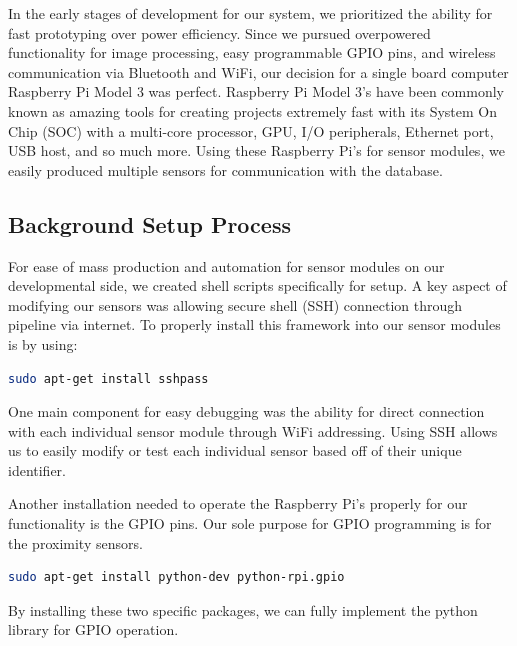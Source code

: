 In the early stages of development for our system, we prioritized the ability for fast prototyping over power efficiency. 
Since we pursued overpowered functionality for image processing, easy programmable GPIO pins, and wireless communication via Bluetooth and WiFi, our decision for a single board computer Raspberry Pi Model 3 was perfect.
Raspberry Pi Model 3's have been commonly known as amazing tools for creating projects extremely fast with its System On Chip (SOC) with a multi-core processor, GPU, I/O peripherals, Ethernet port, USB host, and so much more.
Using these Raspberry Pi's for sensor modules, we easily produced multiple sensors for communication with the database. 

\subsection{Background Setup Process} %
For ease of mass production and automation for sensor modules on our developmental side, we created shell scripts specifically for setup.
A key aspect of modifying our sensors was allowing secure shell (SSH) connection through pipeline via internet.
To properly install this framework into our sensor modules is by using:

\vspace{0.5cm}
\begin{lstlisting}[language=bash]
sudo apt-get install sshpass
\end{lstlisting}
\vspace{0.5cm}

One main component for easy debugging was the ability for direct connection with each individual sensor module through WiFi addressing.
Using SSH allows us to easily modify or test each individual sensor based off of their unique identifier.

Another installation needed to operate the Raspberry Pi's properly for our functionality is the GPIO pins.
Our sole purpose for GPIO programming is for the proximity sensors.
\vspace{0.5cm}
\begin{lstlisting}[language=bash]
sudo apt-get install python-dev python-rpi.gpio
\end{lstlisting}
\vspace{0.5cm}

By installing these two specific packages, we can fully implement the python library for GPIO operation.

